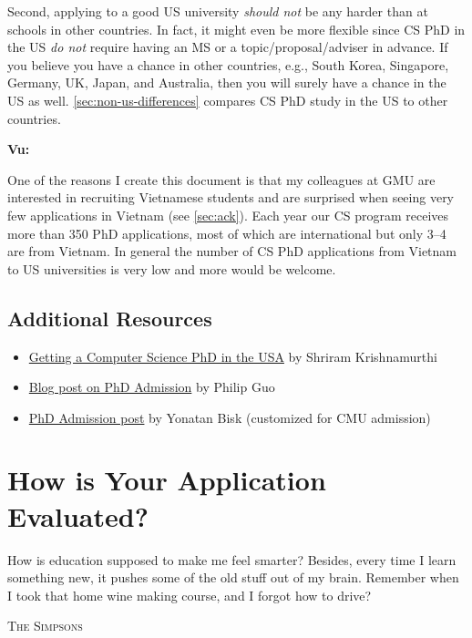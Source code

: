 \documentclass[oneside,11pt]{book}
\newenvironment{commentbox}[1][]{
  \small
  \begin{mybox}
    {\small \textbf{#1}}
  }{
  \end{mybox}
}
\begin{document}
Second, applying to a good US university \emph{should not} be any harder than at schools in other countries. In fact, it might even be more flexible since CS PhD in the US \emph{do not} require having an MS or a topic/proposal/adviser in advance. If you believe you have a chance in other countries, e.g., South Korea, Singapore, Germany, UK, Japan, and Australia, then you will surely have a chance in the US as well. \autoref{sec:non-us-differences} compares CS PhD study in the US to other countries.

\begin{commentbox}[Vu:]
  One of the reasons I create this document is that my colleagues at GMU are interested in recruiting Vietnamese students and are surprised when seeing very few applications in Vietnam (see \autoref{sec:ack}). Each year our CS program receives more than 350 PhD applications, most of which are international but only 3--4 are from Vietnam. In general the number of CS PhD applications from Vietnam to US universities is very low and more would be welcome.
\end{commentbox}




\section*{Additional Resources}
\begin{itemize}
  \item \href{https://parentheticallyspeaking.org/articles/us-cs-phd-faq/}{Getting a Computer Science PhD in the USA} by Shriram Krishnamurthi
  \item  \href{https://pg.ucsd.edu/PhD-application-tips.htm}{Blog post on PhD Admission} by Philip Guo
  \item   \href{https://talkingtorobots.com/yonatanbisk.html}{PhD Admission post} by Yonatan Bisk (customized for CMU admission)
\end{itemize}

\chapter{How is Your Application Evaluated?}\label{sec:evalapps}

\epigraph{How is education supposed to make me feel smarter? Besides, every time I learn something new, it pushes some of the old stuff out of my brain. Remember when I took that home wine making course, and I forgot how to drive?}{\textsc{The Simpsons}}
\end{document}
